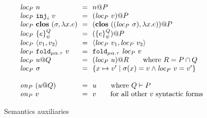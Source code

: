 \documentclass[10pt]{article}
\makeatletter
\newcommand{\kw}[1]{\ensuremath{\mathtt{#1}}}
\newcommand{\trec}[2]{\ensuremath{\mu {#1}.{#2}}}
\newcommand{\einj}[2]{\ensuremath{\kw{inj}_{#1}~{#2}}}
\newcommand{\epair}[2]{\ensuremath{\langle {#1}, {#2} \rangle}}
\newcommand{\elam}[2]{\ensuremath{\lambda {#1}.{#2}}}
\newcommand{\efold}[2]{\ensuremath{\kw{fold}_{#1}~{#2}}}
\newcommand{\vshare}[3]{\ensuremath{\{{#3}\}^{#1}_{#2}}}
\newcommand{\vloc}[2]{\ensuremath{{#1}\kw{@}{#2}}}
\newcommand{\vclos}[2]{\ensuremath{\mathbf{clos}~({#1},{#2})}}
\newcommand{\env}{\ensuremath{\sigma}}
\newcommand{\locof}[2]{\ensuremath{\mathit{loc}_{#1}~{#2}}}
\newcommand{\getat}[2]{\ensuremath{\mathit{on}_{#1}~{#2}}}
\makeatother
\begin{document}
\begin{figure}
\[\begin{array}{l@{~~=~~}l}
    \locof{P}{n} & \vloc{n}{P} \\
    \locof{P}{\einj{i}{v}} & \vloc{(\locof{P}{v})}{P} \\
    \locof{P}{\vclos{\env}{\elam{x}{e}}} & \vloc{(\vclos{(\locof{P}{\env})}{\elam{x}{e}})}{P}\\
    \locof{P}{\vshare{Q}{\psi}{e}} & \vloc{(\vshare{Q}{\psi}{e})}{P} \\
    \locof{P}{\epair{v_1}{v_2}} & \epair{\locof{P}{v_1}}{\locof{P}{v_2}}\\
    \locof{P}{ \efold{\trec{\alpha}{\tau}}{v}} &  \efold{\trec{\alpha}{\tau}}{\locof{P}{v}}\\
    \locof{P}{\vloc{u}{Q}} & \vloc{(\locof{P}{u})}{R} \qquad\text{where }R = P \cap Q\\
    \locof{P}{\sigma} & \{ x \mapsto v' \mid \sigma(x) = v \land \locof{P}{v} = v' \}\\
    \multicolumn{2}{c}{}\\
    \getat{P}{(\vloc{u}{Q})} & u \qquad \text{where }Q \vdash P\\
    \getat{P}{v} & v \qquad \text{for all other $v$ syntactic forms}\\
  \end{array}
\]
\caption{Semantics auxiliaries}
\label{fig:auxsem}
\end{figure}
\end{document}
